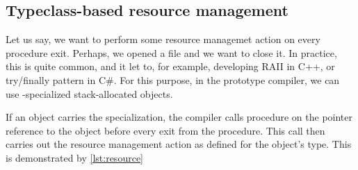 \subsection{Typeclass-based resource management}

Let us say, we want to perform some resource managemet action on every procedure exit. Perhaps, we opened a file and we want to close it. In practice, this is quite common, and it let to, for example, developing RAII in C++, or try/finally pattern in C\#. For this purpose, in the prototype compiler, we can use -specialized stack-allocated objects.

If an object carries the  specialization, the compiler calls  procedure on the pointer reference to the object before every exit from the procedure. This  call then carries out the resource management action as defined for the object's type. This is demonstrated by \cref{lst:resource}

